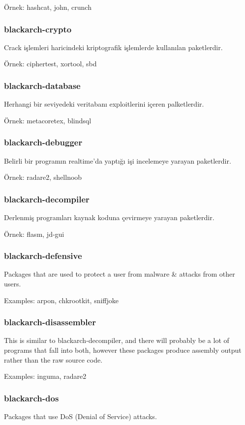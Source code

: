\documentclass[a4paper, oneside, 11pt]{book}
\begin{document}
Örnek: hashcat, john, crunch

\subsubsection{blackarch-crypto}
Crack işlemleri haricindeki kriptografik işlemlerde kullanılan paketlerdir.

Örnek: ciphertest, xortool, sbd

\subsubsection{blackarch-database}
Herhangi bir seviyedeki veritabanı exploitlerini içeren palketlerdir.

Örnek: metacoretex, blindsql

\subsubsection{blackarch-debugger}
Belirli bir programın realtime'da yaptığı işi incelemeye yarayan paketlerdir.

Örnek: radare2, shellnoob

\subsubsection{blackarch-decompiler}
Derlenmiş programları kaynak koduna çevirmeye yarayan paketlerdir.

Örnek: flasm, jd-gui

\subsubsection{blackarch-defensive}
Packages that are used to protect a user from malware \& attacks from other users.

Examples: arpon, chkrootkit, sniffjoke

\subsubsection{blackarch-disassembler}
This is similar to blackarch-decompiler, and there will probably be a lot
of programs that fall into both, however these packages produce assembly output
rather than the raw source code.

Examples: inguma, radare2

\subsubsection{blackarch-dos}
Packages that use DoS (Denial of Service) attacks.
\end{document}
